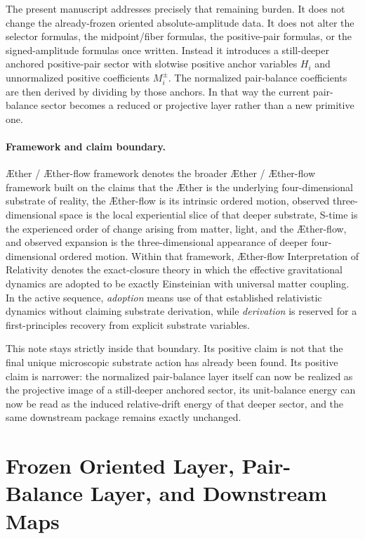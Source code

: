 \documentclass[11pt]{article}
\newcommand{\Aether}{\AE{}ther}
\newcommand{\Aflow}{\AE{}ther-flow}
\newcommand{\TheoryName}{\Aflow{} Interpretation of Relativity}
\newcommand{\TheoryProgram}{\Aether{} / \Aflow{} framework}
\begin{document}
The present manuscript addresses precisely that remaining burden. It does not change the already-frozen oriented absolute-amplitude data. It does not alter the selector formulas, the midpoint/fiber formulas, the positive-pair formulas, or the signed-amplitude formulas once written. Instead it introduces a still-deeper anchored positive-pair sector with slotwise positive anchor variables \(H_i\) and unnormalized positive coefficients \(M_i^\pm\). The normalized pair-balance coefficients are then derived by dividing by those anchors. In that way the current pair-balance sector becomes a reduced or projective layer rather than a new primitive one.

\paragraph{Framework and claim boundary.}
\TheoryProgram{} denotes the broader \Aether{} / \Aflow{} framework built on the claims that the \Aether{} is the underlying four-dimensional substrate of reality, the \Aflow{} is its intrinsic ordered motion, observed three-dimensional space is the local experiential slice of that deeper substrate, S-time is the experienced order of change arising from matter, light, and the \Aflow{}, and observed expansion is the three-dimensional appearance of deeper four-dimensional ordered motion. Within that framework, \TheoryName{} denotes the exact-closure theory in which the effective gravitational dynamics are adopted to be exactly Einsteinian with universal matter coupling. In the active sequence, \emph{adoption} means use of that established relativistic dynamics without claiming substrate derivation, while \emph{derivation} is reserved for a first-principles recovery from explicit substrate variables.

This note stays strictly inside that boundary. Its positive claim is not that the final unique microscopic substrate action has already been found. Its positive claim is narrower: the normalized pair-balance layer itself can now be realized as the projective image of a still-deeper anchored sector, its unit-balance energy can now be read as the induced relative-drift energy of that deeper sector, and the same downstream package remains exactly unchanged.

\section{Frozen Oriented Layer, Pair-Balance Layer, and Downstream Maps}
\end{document}
